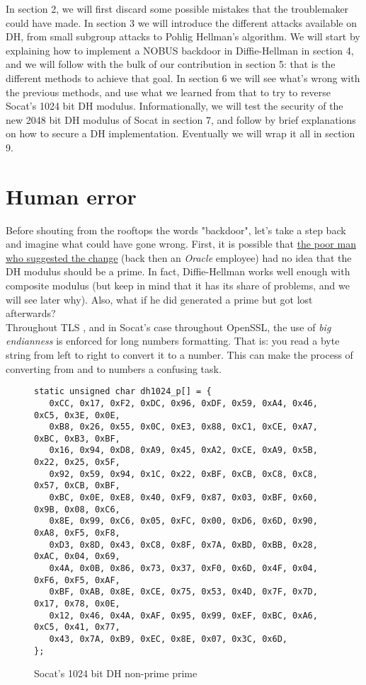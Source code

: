 \documentclass[a4paper,11pt]{article}
\begin{document}
In section 2, we will first discard some possible mistakes that the troublemaker could have made. In section 3 we will introduce the different attacks available on DH, from small subgroup attacks to Pohlig Hellman's algorithm. We will start by explaining how to implement a NOBUS backdoor in Diffie-Hellman in section 4, and we will follow with the bulk of our contribution in section 5: that is the different methods to achieve that goal. In section 6 we will see what's wrong with the previous methods, and use what we learned from that to try to reverse Socat's 1024 bit DH modulus. Informationally, we will test the security of the new 2048 bit DH modulus of Socat in section 7, and follow by brief explanations on how to secure a DH implementation. Eventually we will wrap it all in section 9.

\section{Human error}\label{mistake}

Before shouting from the rooftops the words "backdoor", let's take a step back and imagine what could have gone wrong. First, it is possible that \href{http://repo.or.cz/socat.git/commitdiff/281d1bd6515c2f0f8984fc168fb3d3b91c20bdc0}{the poor man who suggested the change} (back then an \emph{Oracle} employee) had no idea that the DH modulus should be a prime. In fact, Diffie-Hellman works well enough with composite modulus (but keep in mind that it has its share of problems, and we will see later why). Also, what if he did generated a prime but got lost afterwards?\\

Throughout TLS \cite{tls12}, and in Socat's case throughout OpenSSL, the use of \emph{big endianness} is enforced for long numbers formatting. That is: you read a byte string from left to right to convert it to a number. This can make the process of converting from and to numbers a confusing task.

\begin{figure}[H]
\begin{verbatim}
static unsigned char dh1024_p[] = {
   0xCC, 0x17, 0xF2, 0xDC, 0x96, 0xDF, 0x59, 0xA4, 0x46, 0xC5, 0x3E, 0x0E, 
   0xB8, 0x26, 0x55, 0x0C, 0xE3, 0x88, 0xC1, 0xCE, 0xA7, 0xBC, 0xB3, 0xBF, 
   0x16, 0x94, 0xD8, 0xA9, 0x45, 0xA2, 0xCE, 0xA9, 0x5B, 0x22, 0x25, 0x5F, 
   0x92, 0x59, 0x94, 0x1C, 0x22, 0xBF, 0xCB, 0xC8, 0xC8, 0x57, 0xCB, 0xBF, 
   0xBC, 0x0E, 0xE8, 0x40, 0xF9, 0x87, 0x03, 0xBF, 0x60, 0x9B, 0x08, 0xC6, 
   0x8E, 0x99, 0xC6, 0x05, 0xFC, 0x00, 0xD6, 0x6D, 0x90, 0xA8, 0xF5, 0xF8, 
   0xD3, 0x8D, 0x43, 0xC8, 0x8F, 0x7A, 0xBD, 0xBB, 0x28, 0xAC, 0x04, 0x69, 
   0x4A, 0x0B, 0x86, 0x73, 0x37, 0xF0, 0x6D, 0x4F, 0x04, 0xF6, 0xF5, 0xAF, 
   0xBF, 0xAB, 0x8E, 0xCE, 0x75, 0x53, 0x4D, 0x7F, 0x7D, 0x17, 0x78, 0x0E, 
   0x12, 0x46, 0x4A, 0xAF, 0x95, 0x99, 0xEF, 0xBC, 0xA6, 0xC5, 0x41, 0x77, 
   0x43, 0x7A, 0xB9, 0xEC, 0x8E, 0x07, 0x3C, 0x6D, 
};
\end{verbatim}
\caption{Socat's 1024 bit DH non-prime prime}
\label{fig:cert}
\end{figure}
\end{document}
